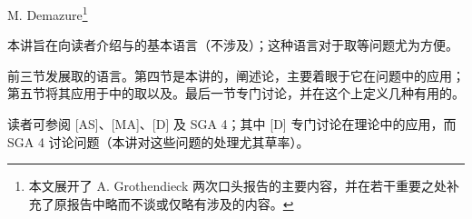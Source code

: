 \begin{center}M. Demazure\footnote{本文展开了 A. Grothendieck 两次口头报告的主要内容，并在若干重要之处补充了原报告中略而不谈或仅略有涉及的内容。}\end{center}
本讲旨在向读者介绍与的基本语言（不涉及）；这种语言对于取等问题尤为方便。

前三节发展取的语言。第四节是本讲的，阐述论，主要着眼于它在问题中的应用；第五节将其应用于中的取以及。最后一节专门讨论，并在这个上定义几种有用的。

读者可参阅 [AS]、[MA]、[D] 及 SGA 4；其中 [D] 专门讨论在理论中的应用，而 SGA 4 讨论问题（本讲对这些问题的处理尤其草率）。

